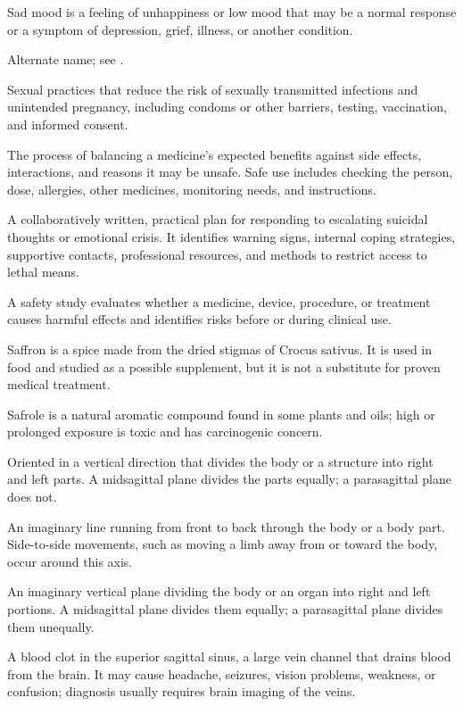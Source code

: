  Sad mood is a feeling of unhappiness or low mood that may be a normal response or a symptom of depression, grief, illness, or another condition.

 Alternate name; see .

 Sexual practices that reduce the risk of sexually transmitted infections and unintended pregnancy, including condoms or other barriers, testing, vaccination, and informed consent.

 The process of balancing a medicine’s expected benefits against side effects, interactions, and reasons it may be unsafe. Safe use includes checking the person, dose, allergies, other medicines, monitoring needs, and instructions.

 A collaboratively written, practical plan for responding to escalating suicidal thoughts
or emotional crisis. It identifies warning signs, internal coping strategies, supportive
contacts, professional resources, and methods to restrict access to lethal means.

 A safety study evaluates whether a medicine, device, procedure, or treatment causes harmful effects and identifies risks before or during clinical use.

 Saffron is a spice made from the dried stigmas of Crocus sativus. It is used in food and studied as a possible supplement, but it is not a substitute for proven medical treatment.

 Safrole is a natural aromatic compound found in some plants and oils; high or prolonged exposure is toxic and has carcinogenic concern.

 Oriented in a vertical direction that divides the body or a structure into right and left parts. A midsagittal plane divides the parts equally; a parasagittal plane does not.

 An imaginary line running from front to back through the body or a body part. Side-to-side movements, such as moving a limb away from or toward the body, occur around this axis.

 An imaginary vertical plane dividing the body or an organ into right and left portions. A midsagittal plane divides them equally; a parasagittal plane divides them unequally.

 A blood clot in the superior sagittal sinus, a large vein channel that drains blood from the brain. It may cause headache, seizures, vision problems, weakness, or confusion; diagnosis usually requires brain imaging of the veins.

